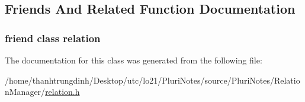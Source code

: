 \subsection{Friends And Related Function Documentation}
\subsubsection[{\texorpdfstring{relation}{relation}}]{\setlength{\rightskip}{0pt plus 5cm}friend class {\bf relation}\hspace{0.3cm}{\ttfamily [friend]}}\hypertarget{classrelation_1_1Iterator_abf93246f9fba84b81cde8501c84c3fa2}{}\label{classrelation_1_1Iterator_abf93246f9fba84b81cde8501c84c3fa2}


The documentation for this class was generated from the following file\+:\begin{DoxyCompactItemize}
\item 
/home/thanhtrungdinh/\+Desktop/utc/lo21/\+Pluri\+Notes/source/\+Pluri\+Notes/\+Relation\+Manager/\hyperlink{relation_8h}{relation.\+h}\end{DoxyCompactItemize}
